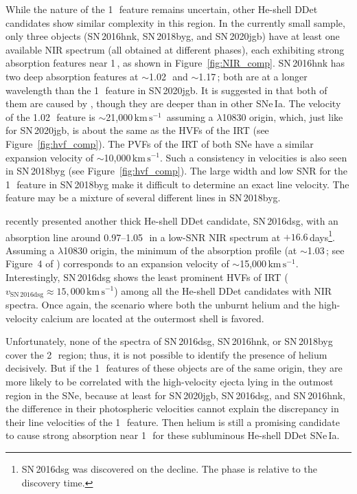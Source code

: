 \documentclass[twocolumn]{aastex631}
\newcommand{\sn}{SN\,2020jgb}
\newcommand{\kms}{$\mathrm{km}\,\mathrm{s}^{-1}$}
\begin{document}
\begin{CJK*}{UTF8}{gbsn}
While the nature of the 1\,\micron\ feature remains uncertain, other He-shell DDet candidates show similar complexity in this region. In the currently small sample, only three objects (SN\,2016hnk, SN\,2018byg, and \sn) have at least one available NIR spectrum (all obtained at different phases), each exhibiting strong absorption features near 1\,\micron, as shown in Figure~\ref{fig:NIR_comp}. SN\,2016hnk has two deep absorption features at $\sim$1.02\,\micron\ and $\sim$1.17\,\micron; both are at a longer wavelength than the 1\,\micron\ feature in \sn. It is suggested in \citet{galbany_16hnk_2019} that both of them are caused by , though they are deeper than in other SNe\,Ia. The velocity of the 1.02\,\micron\ feature is $\sim$21,000\,\kms\ assuming a  $\lambda$10830 origin, which, just like for \sn, is about the same as the HVFs of the  IRT (see Figure~\ref{fig:hvf_comp}). The PVFs of the  IRT of both SNe have a similar expansion velocity of $\sim$10,000\,\kms. Such a consistency in velocities is also seen in SN\,2018byg (see Figure~\ref{fig:hvf_comp}). The large width and low SNR for the 1\,\micron\ feature in SN\,2018byg make it difficult to determine an exact line velocity. The feature may be a mixture of several different lines in SN\,2018byg.

\citet{Dong_16dsg_2022} recently presented another thick He-shell DDet candidate, SN\,2016dsg, with an absorption line around 0.97--1.05\,\micron\ in a low-SNR NIR spectrum at $+16.6$\,days\footnote{SN\,2016dsg was discovered on the decline. The phase is relative to the discovery time.}. Assuming a  $\lambda$10830 origin, the minimum of the absorption profile (at $\sim$1.03\,\micron; see Figure~4 of \citealp{Dong_16dsg_2022}) corresponds to an expansion velocity of $\sim$15,000\,\kms. Interestingly, SN\,2016dsg shows the least prominent HVFs of  IRT ($v_\mathrm{SN\,2016dsg} \approx 15,000$\,\kms) among all the He-shell DDet candidates with NIR spectra. Once again, the scenario where both the unburnt helium and the high-velocity calcium are located at the outermost shell is favored.

Unfortunately, none of the spectra of SN\,2016dsg, SN\,2016hnk, or SN\,2018byg cover the 2\,\micron\ region; thus, it is not possible to identify the presence of helium decisively. But if the 1\,\micron\ features of these objects are of the same origin, they are more likely to be correlated with the high-velocity ejecta lying in the outmost region in the SNe, because at least for \sn, SN\,2016dsg, and SN\,2016hnk, the difference in their photospheric velocities cannot explain the discrepancy in their line velocities of the 1\,\micron\ feature. Then helium is still a promising candidate to cause strong absorption near 1\,\micron\ for these subluminous He-shell DDet SNe\,Ia.


\end{CJK*}
\end{document}
